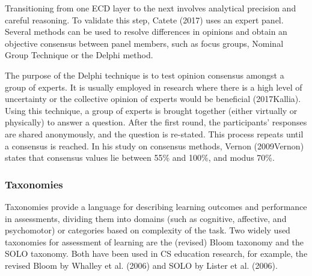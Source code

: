 Transitioning from one ECD layer to the next involves analytical precision and careful reasoning. To validate this step, Catete (2017) uses an expert panel. Several methods can be used to resolve differences in opinions and obtain an objective consensus between panel members, such as focus groups, Nominal Group Technique or the Delphi method.

The purpose of the Delphi technique is to test opinion consensus amongst a group of experts. It is usually employed in research where there is a high level of uncertainty or the collective opinion of
experts would be beneficial (2017Kallia). Using this technique, a group of experts is brought together (either virtually or physically) to answer a question. After the first round, the participants' responses are shared anonymously, and the question is re-stated. This process repeats until a consensus is reached. In his study on consensus methods, Vernon (2009Vernon) states that consensus values lie between 55\% and 100\%, and modus 70\%.





\subsubsection*{Taxonomies}

Taxonomies provide a language for describing learning outcomes and
performance in assessments, dividing them into domains (such as cognitive, affective, and psychomotor) or categories based on complexity of the task. Two widely used taxonomies for assessment of learning are the (revised) Bloom
taxonomy and the SOLO taxonomy. Both have been used in CS education research, for example, the revised Bloom by Whalley et al. (2006) and SOLO by Lister et al. (2006).

